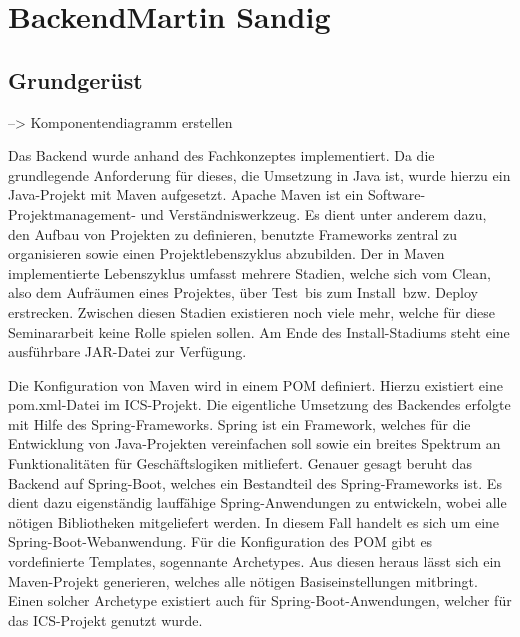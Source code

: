 	\section[Backend]{Backend{\hfill \normalsize Martin Sandig}}
	\subsection{Grundgerüst}\label{umsetzung:backend:grundgeruest}
	--> Komponentendiagramm erstellen
	


	Das Backend wurde anhand des Fachkonzeptes implementiert. Da die grundlegende Anforderung für dieses, die Umsetzung in Java ist, wurde hierzu ein Java-Projekt mit Maven aufgesetzt. Apache Maven ist ein Software-Projektmanagement- und Verständniswerkzeug.\autocite{ApacheSoftwareFoundation} Es dient unter anderem dazu, den Aufbau von Projekten zu definieren, benutzte Frameworks zentral zu organisieren sowie einen Projektlebenszyklus abzubilden. Der in Maven implementierte Lebenszyklus umfasst mehrere Stadien, welche sich vom \glqq Clean\grqq, also dem Aufräumen eines Projektes, über \glqq Test\grqq \, bis zum \glqq Install\grqq \, bzw. \glqq Deploy\grqq \, erstrecken. Zwischen diesen Stadien existieren noch viele mehr, welche für diese Seminararbeit keine Rolle spielen sollen. Am Ende des \glqq Install\grqq -Stadiums steht eine ausführbare JAR-Datei zur Verfügung.

	Die Konfiguration von Maven wird in einem \ac{POM} definiert. Hierzu existiert eine \glqq pom.xml\grqq-Datei im \ac{ICS}-Projekt. Die eigentliche Umsetzung des Backendes erfolgte mit Hilfe des \glqq Spring\grqq -Frameworks. Spring ist ein Framework, welches für die Entwicklung von Java-Projekten vereinfachen soll sowie ein breites Spektrum an Funktionalitäten für Geschäftslogiken mitliefert.  Genauer gesagt beruht das Backend auf \glqq Spring-Boot\grqq, welches ein Bestandteil des Spring-Frameworks ist. Es dient dazu eigenständig lauffähige Spring-Anwendungen zu entwickeln, wobei alle nötigen Bibliotheken mitgeliefert werden.\autocite{PivotalSoftwareInc} In diesem Fall handelt es sich um eine Spring-Boot-Webanwendung. Für die Konfiguration des \ac{POM} gibt es vordefinierte Templates, sogennante \glqq Archetypes\grqq. Aus diesen heraus lässt sich ein Maven-Projekt generieren, welches alle nötigen Basiseinstellungen mitbringt. Einen solcher Archetype existiert auch für Spring-Boot-Anwendungen, welcher für das \ac{ICS}-Projekt genutzt wurde.

